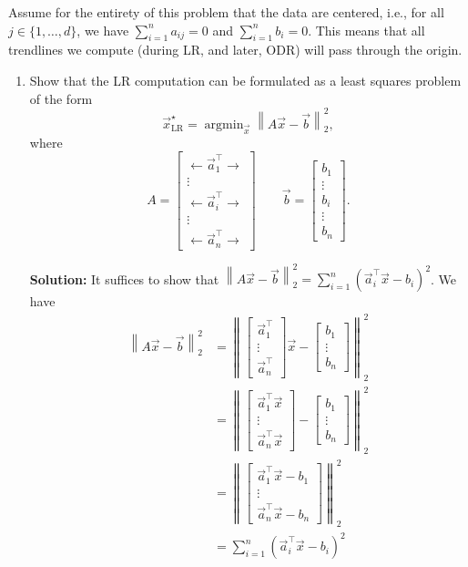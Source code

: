 \documentclass[10pt]{article}
\DeclareMathOperator*{\argmin}{argmin}
\begin{document}
Assume for the entirety of this problem that the data are centered, i.e., for all $j \in \{1, \ldots, d\}$, we have $\sum_{i=1}^{n} a_{ij} = 0$ and $\sum_{i=1}^{n} b_i = 0$. This means that all trendlines we compute (during LR, and later, ODR) will pass through the origin.

\begin{enumerate}[label=(\alph*)]
\item Show that the LR computation can be formulated as a least squares problem of the form
\begin{equation}
\vec{x}^\star_{\text{LR}} = \argmin_{\vec{x}} \left\| A\vec{x} - \vec{b} \right\|_2^2,
\end{equation}
where
\begin{equation}
A = \begin{bmatrix} \leftarrow \vec{a}_1^\top \rightarrow \\ \vdots \\ \leftarrow \vec{a}_i^\top \rightarrow \\ \vdots \\ \leftarrow \vec{a}_n^\top \rightarrow \end{bmatrix} \qquad \vec{b} = \begin{bmatrix} b_1 \\ \vdots \\ b_i \\ \vdots \\ b_n \end{bmatrix}.
\end{equation}

\textbf{Solution:} It suffices to show that $\left\| A\vec{x} - \vec{b} \right\|_2^2 = \sum_{i=1}^{n} (\vec{a}_i^\top \vec{x} - b_i)^2$. We have
\begin{align}
\left\| A\vec{x} - \vec{b} \right\|_2^2
&= \left\| \begin{bmatrix} \vec{a}_1^\top \\ \vdots \\ \vec{a}_n^\top \end{bmatrix} \vec{x} - \begin{bmatrix} b_1 \\ \vdots \\ b_n \end{bmatrix} \right\|_2^2 \\
&= \left\| \begin{bmatrix} \vec{a}_1^\top \vec{x} \\ \vdots \\ \vec{a}_n^\top \vec{x} \end{bmatrix} - \begin{bmatrix} b_1 \\ \vdots \\ b_n \end{bmatrix} \right\|_2^2 \\
&= \left\| \begin{bmatrix} \vec{a}_1^\top \vec{x} - b_1 \\ \vdots \\ \vec{a}_n^\top \vec{x} - b_n \end{bmatrix} \right\|_2^2 \\
&= \sum_{i=1}^{n} (\vec{a}_i^\top \vec{x} - b_i)^2
\end{align}


\end{enumerate}
\end{document}
